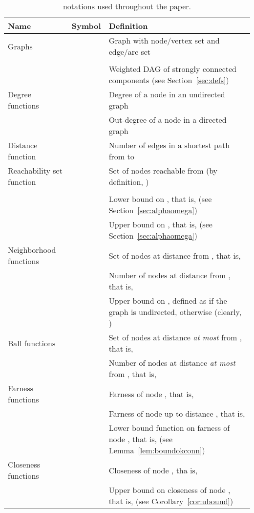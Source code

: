 \documentclass{acm_proc_article-sp}
\begin{document}



\pagestyle{plain}
\sloppy

\begin{table*}
\begin{center}
\caption{notations used throughout the paper.}
\label{tbl:notation}
\begin{tabular}{||p{4cm}|p{2cm}|p{10cm}||}
\hline
\textbf{Name} & \textbf{Symbol} & \textbf{Definition}\\
\hline\hline
Graphs &  & Graph with node/vertex set  and edge/arc set \\
\cline{2-3}
&  & \\
\cline{2-3}
&  & Weighted DAG of strongly connected components (see Section~\ref{sec:defs})\\
\hline
Degree functions &  & Degree of a node in an undirected graph\\
\cline{2-3}
&  & Out-degree of a node in a directed graph\\
\hline
Distance function &  & Number of edges in a shortest path from  to \\
\hline
Reachability set function &  & Set of nodes reachable from  (by definition, )\\
\cline{2-3}
&  & \\
\cline{2-3}
&  & Lower bound on , that is,  (see Section~\ref{sec:alphaomega})\\
\cline{2-3}
&  & Upper bound on , that is,  (see Section~\ref{sec:alphaomega}) \\
\hline
Neighborhood functions &  & Set of nodes at distance  from , that is, \\
\cline{2-3}
&  & Number of nodes at distance  from , that is, \\
\cline{2-3}
&  & Upper bound on , defined as  if the graph is undirected,  otherwise (clearly, )\\
\hline
Ball functions &  & Set of nodes at distance \textit{at most}  from , that is, \\
\cline{2-3}
&  & Number of nodes at distance \textit{at most}  from , that is, \\
\hline
Farness functions &  & Farness of node , that is, \\
\cline{2-3}
&  & Farness of node  up to distance , that is, \\
\cline{2-3}
&  & Lower bound function on farness of node , that is,  (see Lemma~\ref{lem:boundokconn})\\
\hline
Closeness functions &  & Closeness of node , tha is, \\
\cline{2-3}
&  & Upper bound on closeness of node , that is,  (see Corollary~\ref{cor:ubound})\\
\hline
\end{tabular}

\end{center}
\end{table*}
\end{document}

